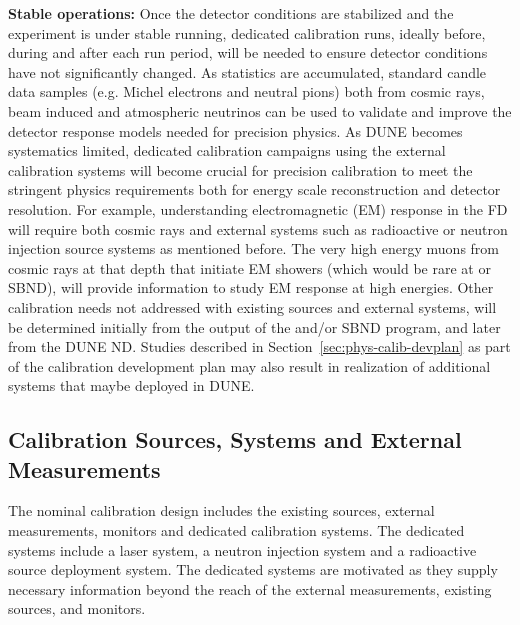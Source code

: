 \textbf{Stable operations:} Once the detector conditions are stabilized and the experiment is under stable running, dedicated calibration runs, ideally before, during and after each run period, will be needed to ensure detector conditions have not significantly changed. As statistics are accumulated, standard candle data samples (e.g. Michel electrons and neutral pions) both from cosmic rays, beam induced and atmospheric neutrinos can be used to validate and improve the detector response models needed for precision physics. As DUNE becomes systematics limited, dedicated calibration campaigns using the external calibration systems will become crucial for precision calibration to meet the stringent physics requirements both for energy scale reconstruction and detector resolution. For example, understanding electromagnetic (EM) response in the FD will require both cosmic rays and external systems such as radioactive or neutron injection source systems as mentioned before. The very high energy muons from cosmic rays at that depth that initiate EM showers (which would be rare at  or SBND), will provide information to study EM response at high energies. Other calibration needs not addressed with existing sources and external systems, will be determined initially from the output of the  and\slash or SBND program, and later from the DUNE ND. Studies described in Section~\ref{sec:phys-calib-devplan} as part of the calibration development plan may also result in realization of additional systems that maybe deployed in DUNE.

\subsection{Calibration Sources, Systems and External Measurements}
\label{sec:phys-calib-sources}

The nominal calibration design includes the existing sources, external measurements, monitors and dedicated calibration systems. The dedicated systems include a laser system, a neutron injection system and a radioactive source deployment system. The dedicated systems are motivated as they supply necessary information beyond the reach of the external measurements,  existing sources, and monitors.

